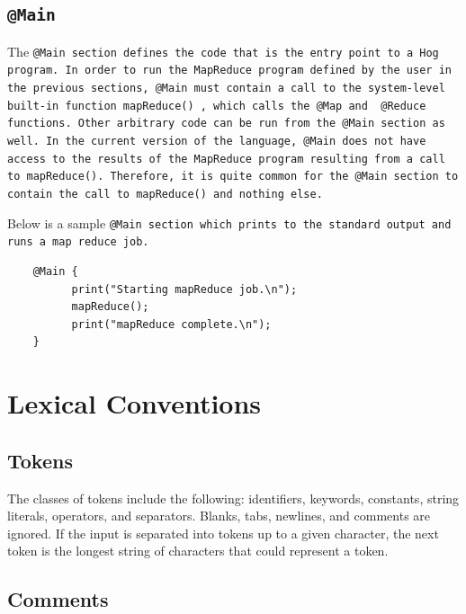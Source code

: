 \documentclass{book}
\begin{document}

\subsection{\tt @Main \rm} %
\label{sec:tt_main_rm}

The \tt @Main \rm section defines the code that is the entry point to a Hog
program. In order to run the MapReduce program defined by the user in the
previous sections, \tt @Main \rm must contain a call to the system-level
built-in function \tt mapReduce() \rm, which calls the \tt @Map \rm and \tt
@Reduce \rm functions. Other arbitrary code can be run from the \tt @Main \rm
section as well. In the current version of the language, \tt @Main \rm does not
have access to the results of the MapReduce program resulting from a call to
\tt mapReduce()\rm. Therefore, it is quite common for the \tt @Main \rm section
to contain the call to \tt mapReduce() \rm and nothing else.

Below is a sample \tt @Main \rm section which prints to the standard output and
runs a map reduce job.

\begin{verbatim}
    @Main {
          print("Starting mapReduce job.\n");
          mapReduce();
          print("mapReduce complete.\n");
    }
\end{verbatim}




\section{Lexical Conventions} %
\label{sec:lexical_conventions}

\subsection{Tokens} %
\label{sub:tokens}

The classes of tokens include the following: identifiers, keywords,
constants, string literals, operators, and separators. Blanks, tabs, newlines, and
comments are ignored. If the input is separated into tokens up to a given
character, the next token is the longest string of characters that could represent
a token.


\subsection{Comments} %
\label{sub:comments}
\end{document}
